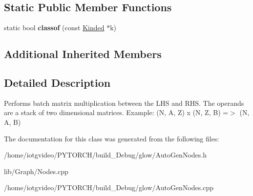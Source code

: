 \subsection*{Static Public Member Functions}
\begin{DoxyCompactItemize}
\item 
\mbox{\label{classglow_1_1_batch_mat_mul_node_a8926aa69b553b2a3a22f20859509c1f2}} 
static bool {\bfseries classof} (const \hyperlink{classglow_1_1_kinded}{Kinded} $\ast$k)
\end{DoxyCompactItemize}
\subsection*{Additional Inherited Members}


\subsection{Detailed Description}
Performs batch matrix multiplication between the L\+HS and R\+HS. The operands are a stack of two dimensional matrices. Example\+: (N, A, Z) x (N, Z, B) =$>$ (N, A, B) 

The documentation for this class was generated from the following files\+:\begin{DoxyCompactItemize}
\item 
/home/iotgvideo/\+P\+Y\+T\+O\+R\+C\+H/build\+\_\+\+Debug/glow/Auto\+Gen\+Nodes.\+h\item 
lib/\+Graph/Nodes.\+cpp\item 
/home/iotgvideo/\+P\+Y\+T\+O\+R\+C\+H/build\+\_\+\+Debug/glow/Auto\+Gen\+Nodes.\+cpp\end{DoxyCompactItemize}

